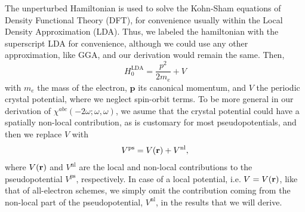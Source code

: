 \documentclass[floatfix,prb,aps,superscriptaddress,11pt,preprint,letterpaper]{revtex4}
\begin{document}
The unperturbed Hamiltonian 
is used to solve the Kohn-Sham equations\cite{kohnPR65} of Density  
Functional Theory (DFT), for convenience usually within the Local  
Density Approximation (LDA). Thus, we labeled the hamiltonian with the  
superscript LDA for convenience, although we could use any other
approximation, like GGA, and our derivation would remain the same. Then,
\begin{equation}\label{h0}
H^{\mathrm{LDA}}_{0}=\frac{p^{2}}{2m_e}+V
\end{equation}
with $m_e$ the mass of the electron, $\mathbf{p}$ its canonical momentum, and 
$V$
 the periodic crystal potential, where we neglect spin-orbit terms.
To be more general in our derivation of
$\chi^{abc}(-2\omega;\omega,\omega)$, we asume
that the crystal potential could have a spatially non-local
contribution, as is customary for most
pseudopotentials, and then we replace $V$ with
\begin{align}\label{ps}
V^{\mathrm{ps}}=V(\mathbf{r})+V^{\mathrm{nl}}
,
\end{align}
where 
$V(\mathbf{r})$ and $V^{\mathrm{nl}}$  are the local and 
non-local contributions to the pseudopotential $V^{\mathrm{ps}}$,
 respectively.
In case of
a local potential, i.e. $V= V(\mathbf{r})$, 
like that of all-electron schemes, 
we simply omit the contribution coming
from the non-local part of the pseudopotential, $V^{\mathrm{nl}}$, in
the results that we will derive.  
\end{document}
